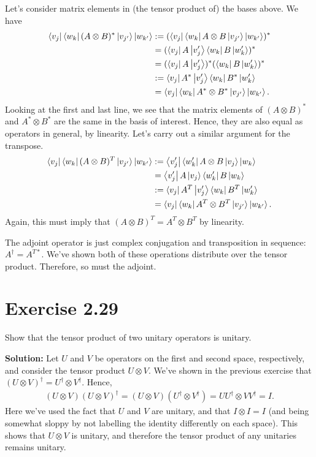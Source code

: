 \documentclass{book}
\begin{document}
    Let's consider matrix elements in (the tensor product of) the bases above. We have
    \begin{align}
    \begin{aligned}
        \bra{v_j}\bra{w_k} (A\otimes B)^* \ket{v_{j'}}\ket{w_{k'}} &:= (\bra{v_j}\bra{w_k} A\otimes B \ket{v_{j'}}\ket{w_{k'}})^* \\
        &= (\bra{v_j}A\ket{v_j'} \bra{w_k}B\ket{w_k'})^* \\
        &= (\bra{v_j}A\ket{v_j'})^* (\bra{w_k}B\ket{w_k'})^* \\
        &:=\bra{v_j}A^*\ket{v_j'}\bra{w_k}B^*\ket{w_k'}\\
        &= \bra{v_j}\bra{w_k} A^*\otimes B^* \ket{v_{j'}}\ket{w_{k'}}.
    \end{aligned}
    \end{align}
    Looking at the first and last line, we see that the matrix elements of $(A\otimes B)^*$ and $A^* \otimes B^*$ are the same in the basis of interest. Hence, they are also equal as operators in general, by linearity. Let's carry out a similar argument for the transpose.
    \begin{align}
    \begin{aligned}
        \bra{v_j}\bra{w_k} (A\otimes B)^T \ket{v_{j'}}\ket{w_{k'}} &:= \bra{v_j'}\bra{w_k'} A\otimes B \ket{v_{j}}\ket{w_{k}} \\
        &= \bra{v_j'}A\ket{v_j} \bra{w_k'}B\ket{w_k} \\
        &:=\bra{v_j}A^T\ket{v_j'}\bra{w_k}B^T\ket{w_k'}\\
        &= \bra{v_j}\bra{w_k} A^T\otimes B^T \ket{v_{j'}}\ket{w_{k'}}.
    \end{aligned}
    \end{align}
    Again, this must imply that $(A\otimes B)^T = A^T \otimes B^T$ by linearity.
    
    The adjoint operator is just complex conjugation and transposition in sequence: $A^\dagger = A^{T*}$. We've shown both of these operations distribute over the tensor product. Therefore, so must the adjoint.
    
\section*{Exercise 2.29}
    Show that the tensor product of two unitary operators is unitary.
    
    \textbf{Solution:} Let $U$ and $V$ be operators on the first and second space, respectively, and consider the tensor product $U\otimes V$. We've shown in the previous exercise that $(U \otimes V)^\dagger = U^\dagger \otimes V^\dagger$. Hence,
    \begin{align}
        (U\otimes V)(U \otimes V)^\dagger = (U\otimes V)(U^\dagger \otimes V^\dagger) = U U^\dagger \otimes V V^\dagger = I. 
    \end{align}
    Here we've used the fact that $U$ and $V$ are unitary, and that $I\otimes I = I$ (and being somewhat sloppy by not labelling the identity differently on each space). This shows that $U\otimes V$ is unitary, and therefore the tensor product of any unitaries remains unitary.
\end{document}
